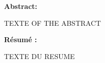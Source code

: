 \thispagestyle{empty}

\noindent \textbf{Abstract:}

\noindent TEXTE OF THE ABSTRACT 

\vfill

\noindent \textbf{Résumé :}

\noindent TEXTE DU RESUME